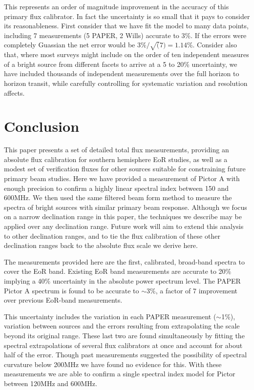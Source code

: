 \documentclass[preprint]{aastex}
\begin{document}
This represents an order of magnitude improvement in the accuracy of this primary 
flux calibrator. In fact the uncertainty is so small that it pays to consider its reasonableness.
First consider that we have fit the model to many data points, including  7 measurements
(5 PAPER, 2 Wills) accurate to 3\%. If the errors were completely Guassian
the net error would be $3\%/\sqrt(7) = 1.14$\%. Consider also that, where most surveys
might include on the order of ten independent measures of a bright source from different facets to arrive at 
a 5 to 20\% uncertainty,  we have included thousands of independent measurements
over the full horizon to horizon transit, while carefully controlling for systematic variation and resolution affects.



 \section{Conclusion}
 \label{sec:Conclusion}

This paper presents a set of detailed total flux measurements, providing
an absolute flux calibration for southern hemisphere EoR studies, as well as a
modest set of verification fluxes for other sources suitable for constraining future primary beam studies.
Here we have provided a measurement of Pictor A with enough precision to confirm
a highly linear spectral index between 150 and 600MHz. We then used the same
filtered beam form method to measure the spectra of bright sources with similar
primary beam response.
Although we focus on a narrow declination range in this paper, the techniques we describe
may be applied over any declination range.  Future work will aim to extend this analysis
to other declination ranges, and to tie the flux calibration of these other declination ranges
back to the absolute flux scale we derive here.

The measurements provided
here are the first, calibrated, broad-band spectra to cover the EoR band. Existing EoR band measurements
are accurate to 20\% implying a 40\% uncertainty in the absolute power spectrum
level.  The PAPER Pictor A spectrum is found to be accurate to 
$\sim$3\%, a factor of 7 improvement over previous EoR-band measurements.

This uncertainty includes the 
variation in each PAPER measurement ($\sim$1\%), variation between sources and the errors resulting
from extrapolating the \citet{Baars:1977p9678} scale beyond its original range. These last
two are found simultaneously by fitting the spectral extrapolations of several flux calibrators
at once and account for about half of the error. Though past measurements suggested the possibility
of spectral curvature below 200MHz we have found no evidence for this.  With these measurements we are able 
to confirm a single spectral index model for Pictor between 120MHz and 600MHz.
\end{document}
